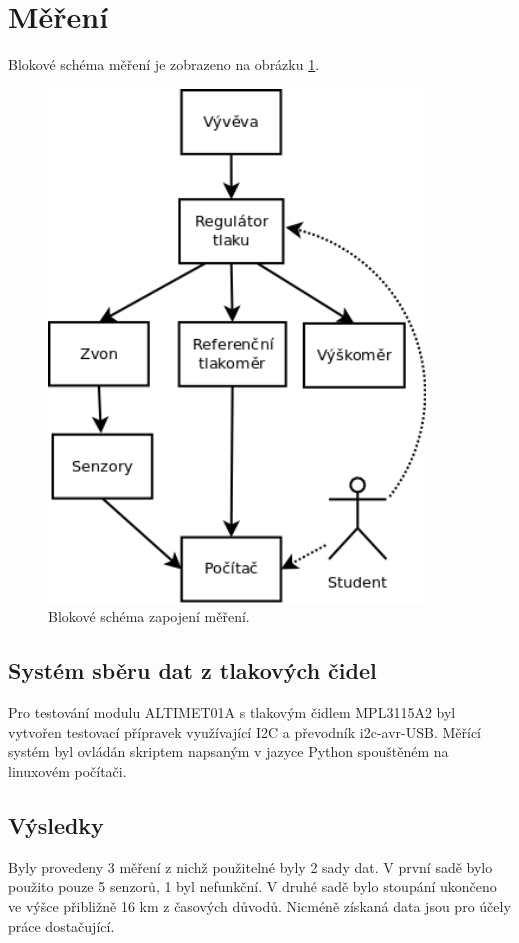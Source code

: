 \documentclass[12pt,a4paper,oneside]{article}
\begin{document}
\section{Měření}

Blokové schéma měření je zobrazeno na obrázku \ref{test_block_scheme}.

\begin{figure} [htbp]
\centering
\includegraphics [width=100mm, origin=c] {./img/Diagram1.png}
\caption{Blokové schéma zapojení měření.}
\label{test_block_scheme}
\end{figure}

\subsection{Systém sběru dat z tlakových čidel}
Pro testování modulu ALTIMET01A s tlakovým čidlem MPL3115A2 byl vytvořen testovací přípravek využívající I2C a převodník i2c-avr-USB. Měřící systém byl ovládán skriptem napsaným v jazyce Python spouštěném na linuxovém počítači.  

\subsection{Výsledky}

Byly provedeny 3 měření z nichž použitelné byly 2 sady dat. V první sadě bylo použito pouze 5 senzorů, 1 byl nefunkční. V druhé sadě bylo stoupání ukončeno ve výšce přibližně 16 km z časových důvodů. Nicméně získaná data jsou pro účely práce dostačující.
\end{document}
